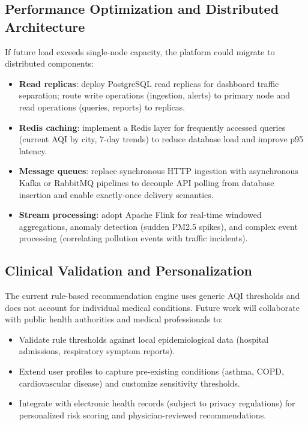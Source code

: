 \subsection{Performance Optimization and Distributed Architecture}
If future load exceeds single-node capacity, the platform could migrate to distributed components:
\begin{itemize}
    \item \textbf{Read replicas}: deploy PostgreSQL read replicas for dashboard traffic separation; route write operations (ingestion, alerts) to primary node and read operations (queries, reports) to replicas.
    \item \textbf{Redis caching}: implement a Redis layer for frequently accessed queries (current AQI by city, 7-day trends) to reduce database load and improve p95 latency.
    \item \textbf{Message queues}: replace synchronous HTTP ingestion with asynchronous Kafka or RabbitMQ pipelines to decouple API polling from database insertion and enable exactly-once delivery semantics.
    \item \textbf{Stream processing}: adopt Apache Flink for real-time windowed aggregations, anomaly detection (sudden PM2.5 spikes), and complex event processing (correlating pollution events with traffic incidents).
\end{itemize}

\subsection{Clinical Validation and Personalization}
The current rule-based recommendation engine uses generic AQI thresholds and does not account for individual medical conditions. Future work will collaborate with public health authorities and medical professionals to:
\begin{itemize}
    \item Validate rule thresholds against local epidemiological data (hospital admissions, respiratory symptom reports).
    \item Extend user profiles to capture pre-existing conditions (asthma, COPD, cardiovascular disease) and customize sensitivity thresholds.
    \item Integrate with electronic health records (subject to privacy regulations) for personalized risk scoring and physician-reviewed recommendations.
\end{itemize}


